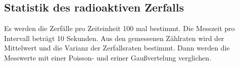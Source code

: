 \subsection{Statistik des radioaktiven Zerfalls}
Es werden die Zerfälle pro Zeiteinheit 100 mal bestimmt.
Die Messzeit pro Intervall beträgt 10 Sekunden.
Aus den gemessenen Zählraten wird der Mittelwert und die Varianz der Zerfallsraten bestimmt.
Dann werden die Messwerte mit einer Poisson- und eriner Gaußvertelung verglichen.